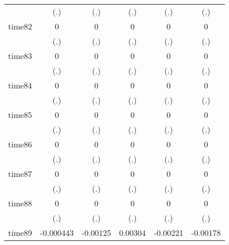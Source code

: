 \begin{table}[htbp]
\begin{tabular}{l*{5}{c}}
            &         (.)         &         (.)         &         (.)         &         (.)         &         (.)         \\
time82      &           0         &           0         &           0         &           0         &           0         \\
            &         (.)         &         (.)         &         (.)         &         (.)         &         (.)         \\
time83      &           0         &           0         &           0         &           0         &           0         \\
            &         (.)         &         (.)         &         (.)         &         (.)         &         (.)         \\
time84      &           0         &           0         &           0         &           0         &           0         \\
            &         (.)         &         (.)         &         (.)         &         (.)         &         (.)         \\
time85      &           0         &           0         &           0         &           0         &           0         \\
            &         (.)         &         (.)         &         (.)         &         (.)         &         (.)         \\
time86      &           0         &           0         &           0         &           0         &           0         \\
            &         (.)         &         (.)         &         (.)         &         (.)         &         (.)         \\
time87      &           0         &           0         &           0         &           0         &           0         \\
            &         (.)         &         (.)         &         (.)         &         (.)         &         (.)         \\
time88      &           0         &           0         &           0         &           0         &           0         \\
            &         (.)         &         (.)         &         (.)         &         (.)         &         (.)         \\
time89      &   -0.000443         &    -0.00125         &     0.00304         &    -0.00221\sym{***}&    -0.00178         \\

\end{tabular}
\end{table}
